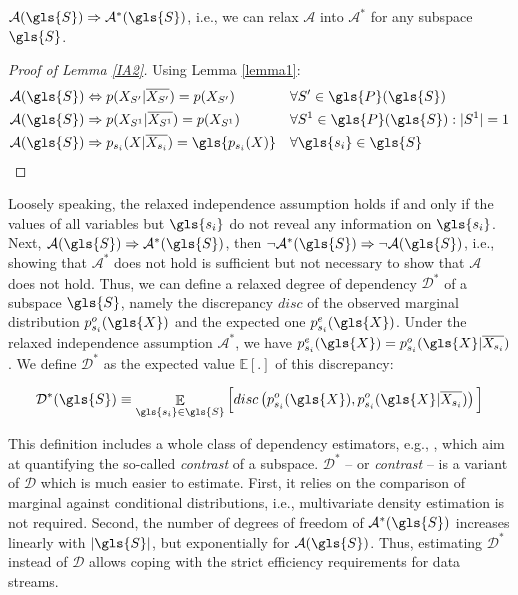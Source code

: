 \begin{lemma} 
	\label{IA2}
	$\mathcal{A}(\gls{S}) \Rightarrow \mathcal{A}^*(\gls{S})$, i.e., we can relax $\mathcal{A}$ into $\mathcal{A}^*$ for any subspace $\gls{S}$.
\end{lemma}
\begin{proof}[Proof of Lemma \ref{IA2}]
	Using Lemma \ref{lemma1}:
	\begin{align*}
	\mathcal{A}(\gls{S}) &\Leftrightarrow p(X_{S'}|\overline{X_{S'}}) =  p(X_{S'}) && \forall S' \in \gls{P}(\gls{S}) \\
	\mathcal{A}(\gls{S}) &\Rightarrow p(X_{S^1}|\overline{X_{S^1}}) = p(X_{S^1}) && \forall S^1 \in \gls{P}(\gls{S}) :|S^1| = 1\\
	\mathcal{A}(\gls{S}) &\Rightarrow p_{s_i}(X|\overline{X_{s_i}}) = \gls{p_{s_{i}}(X)} && \forall \gls{s_i} \in \gls{S} 
	\qedhere
	\end{align*}
\end{proof}

Loosely speaking, the relaxed independence assumption holds if and only if the values of all variables but $\gls{s_i}$ do not reveal any information on $\gls{s_i}$. 
Next, $\mathcal{A}(\gls{S}) \Rightarrow \mathcal{A}^*(\gls{S})$, then $\neg \mathcal{A}^*(\gls{S}) \Rightarrow \neg \mathcal{A}(\gls{S})$, i.e., showing that $\mathcal{A}^*$ does not hold is sufficient but not necessary to show that $\mathcal{A}$ does not hold. 
Thus, we can define a relaxed degree of dependency $\mathcal{D}^*$ of a subspace $\gls{S}$, namely the discrepancy $disc$ of the observed marginal distribution $p^o_{s_i}(\gls{X})$ 
and the expected one $p^{e}_{s_i}(\gls{X})$. Under the relaxed independence assumption $\mathcal{A}^*$, we have $p^{e}_{s_i}(\gls{X}) = p^o_{s_i}(\gls{X}|\overline{X_{s_i}})$. 
We define $\mathcal{D}^*$ as the expected value $\mathbb{E}[.]$ of this discrepancy: 
\begin{definition}
	\label{def:RelaxedDegree}
	\begin{equation}
	\mathcal{D}^*(\gls{S}) \equiv \mathop{\mathbb{E}}_{\gls{s_i} \in \gls{S}}   \Big[disc \left( p^o_{s_{i}}(\gls{X}) , p^o_{s_i}(\gls{X}|\overline{X_{s_i}}) \right)  \Big]
	\end{equation}
\end{definition}
This definition includes a whole class of dependency estimators, e.g., \cite{DBLP:conf/icde/KellerMB12}, which aim at quantifying the so-called  \textit{contrast} of a subspace. 
$\mathcal{D}^*$ -- or \textit{contrast} -- is a variant of $\mathcal{D}$ which is much easier to estimate. 
First, it relies on the comparison of marginal against conditional distributions, 
i.e., multivariate density estimation is not required. 
Second, the number of degrees of freedom of $\mathcal{A}^*(\gls{S})$ increases linearly with $|\gls{S}|$, but exponentially for $\mathcal{A}(\gls{S})$. Thus, estimating $\mathcal{D}^*$ instead of $\mathcal{D}$ allows coping with the strict efficiency requirements for data streams.  

